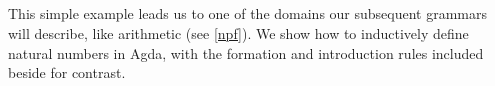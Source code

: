 \begin{code}%
\>[0]\AgdaFunction{\textasciitilde{}}\AgdaSpace{}%
\AgdaSymbol{:}\AgdaSpace{}%
\AgdaSpace{}%
\AgdaSpace{}%
\<%
\\
\>[0]\AgdaFunction{\textasciitilde{}}\AgdaSpace{}%
\AgdaSpace{}%
\AgdaSymbol{=}\AgdaSpace{}%
\AgdaSpace{}%
\AgdaSpace{}%
\AgdaSpace{}%
\AgdaSpace{}%
\AgdaSpace{}%
\<%
\\
%
\\[\AgdaEmptyExtraSkip]%
\>[0]\AgdaSpace{}%
\AgdaSymbol{:}\AgdaSpace{}%
\AgdaSpace{}%
\AgdaSpace{}%
\AgdaSymbol{(}\AgdaSpace{}%
\AgdaSpace{}%
\AgdaSymbol{)}\AgdaSpace{}%
\AgdaSpace{}%
\AgdaSymbol{(}\AgdaSpace{}%
\AgdaSpace{}%
\AgdaSymbol{)}\<%
\\
\>[0]\AgdaSpace{}%
\AgdaSpace{}%
\AgdaSpace{}%
\AgdaSymbol{=}\AgdaSpace{}%
\AgdaSpace{}%
\AgdaSpace{}%
\AgdaSpace{}%
\AgdaSpace{}%
\AgdaSpace{}%
\AgdaSpace{}%
\AgdaSpace{}%
\AgdaSpace{}%
\AgdaSpace{}%
\AgdaSymbol{(}\AgdaFunction{\textasciitilde{}}\AgdaSpace{}%
\AgdaSymbol{)}\<%
\end{code}

This simple example leads us to one of the domains our subsequent grammars will
describe, like arithmetic (see \ref{npf}). We show how to inductively define
natural numbers in Agda, with the formation and introduction rules included
beside for contrast.

